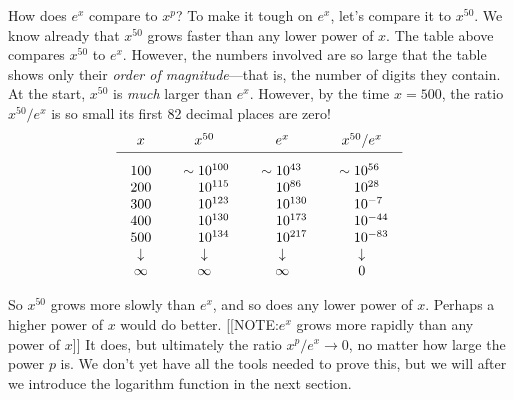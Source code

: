 How does $e^x$ compare to $x^p$?  To make it tough on $e^x$, let's
compare it to $x^{50}$.  We know already that $x^{50}$ grows faster
than any lower power of $x$.  The table above compares $x^{50}$ to
$e^x$.  However, the numbers involved are so large that the table
shows only their {\em order of magnitude\/}---that is, the number of
digits they contain.  At the start, $x^{50}$ is {\em much\/} larger
than $e^x$.  However, by the time $x = 500$, the ratio $x^{50}/e^x$ is
so small its first 82 decimal places are zero!
\addtolength{\arraycolsep}{2pt}
	\[
\begin{array}{cccc}
	x & x^{50} & e^x & x^{50}/e^x \\[2pt] \hline
	\begin{array}{r}
	\rule{0pt}{16pt} 100 \\ 200 \\ 300 \\ 400 \\ 500
	\end{array}
	&
	\begin{array}{r}
	\rule{0pt}{16pt} \sim 10^{100} \\ 10^{115} \\ 10^{123}
		\\ 10^{130} \\ 10^{134} 
	\end{array}
	&
	\begin{array}{r}
		\rule{0pt}{16pt} \sim 10^{43\hphantom{0}} \\ 
		10^{86\hphantom{0}}  \\
		10^{130}  \\
		10^{173}  \\
		10^{217}  
	\end{array}
	&
	\begin{array}{r}
		\rule{0pt}{16pt} \sim 10^{56\hphantom{-}} \\ 
		10^{28\hphantom{-}}  \\
		10^{-7\hphantom{0}}  \\
		10^{-44}  \\
		10^{-83}  
	\end{array}
	\\
	\downarrow & \downarrow & \downarrow & \downarrow \\
	\infty & \infty & \infty & 0 
\end{array}
\]
	\addtolength{\arraycolsep}{-2pt}


	So $x^{50}$ grows more slowly than $e^x$, and so does any lower power of $x$.  Perhaps a higher power of $x$ would do better.  
	[[NOTE:$e^x$ grows more rapidly than any power of $x$]]
It does, but ultimately the ratio $x^p/e^x \to 0$, no matter how large the power $p$ is.  We don't yet have all the tools needed to prove this, but we will after we introduce the logarithm function in the next section.  

